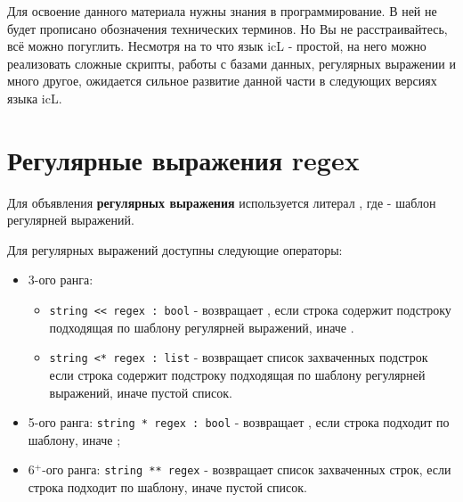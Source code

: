 \documentclass[a4paper, 14pt]{extarticle}
\newenvironment{icItems}
	{ \begin{itemize} [noitemsep,nolistsep] }
	{ \end{itemize} }
\begin{document}
Для освоение данного материала нужны знания в программирование. В ней не будет прописано обозначения технических терминов. Но Вы не расстраивайтесь, всё можно погуглить. Несмотря на то что язык icL - простой, на него можно реализовать сложные скрипты, работы с базами данных, регулярных выражении и много другое, ожидается сильное развитие данной части в следующих версиях языка icL.

\section{Регулярные выражения {\color{bluemarin} regex}}

Для объявления {\bf регулярных выражения} используется литерал , где  - шаблон регулярней выражений.

Для регулярных выражений доступны следующие операторы:
\begin{icItems}
\item
	3-ого ранга:
	\begin{icItems}
	\item
		\lstinline|string << regex : bool| - возвращает \true, если строка содержит подстроку подходящая по шаблону регулярней выражений, иначе \false.
	\item
		\lstinline|string <* regex : list| - возвращает список захваченных подстрок если строка содержит подстроку подходящая по шаблону регулярней выражений, иначе пустой список.
	\end{icItems}

\item 
	5-ого ранга: \lstinline|string * regex : bool| - возвращает \true, если строка подходит по шаблону, иначе \false;

\item 
	6$^+$-ого ранга: \lstinline|string ** regex| - возвращает список захваченных строк, если строка подходит по шаблону, иначе пустой список.
\end{icItems}

\
\end{document}
